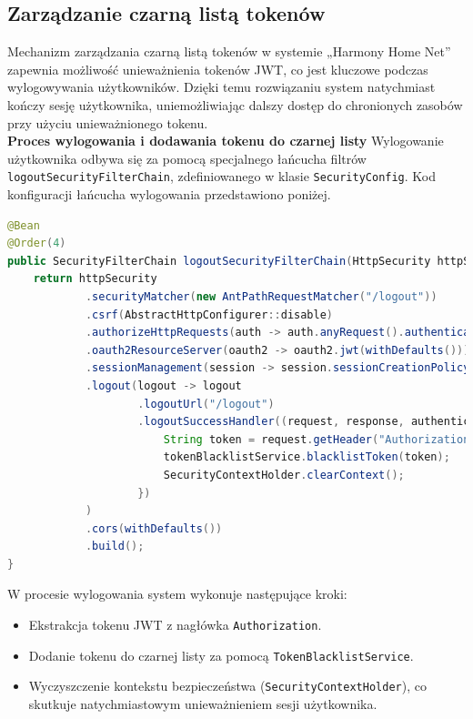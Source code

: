 \subsection{Zarządzanie czarną listą tokenów}

Mechanizm zarządzania czarną listą tokenów w systemie „Harmony Home Net” zapewnia możliwość unieważnienia tokenów JWT, co jest kluczowe podczas wylogowywania użytkowników. Dzięki temu rozwiązaniu system natychmiast kończy sesję użytkownika, uniemożliwiając dalszy dostęp do chronionych zasobów przy użyciu unieważnionego tokenu.\\[-10pt]

\noindent \textbf{Proces wylogowania i dodawania tokenu do czarnej listy}\newline
Wylogowanie użytkownika odbywa się za pomocą specjalnego łańcucha filtrów \texttt{logoutSecurityFilterChain}, zdefiniowanego w klasie \texttt{SecurityConfig}. Kod konfiguracji łańcucha wylogowania przedstawiono poniżej.

\begin{lstlisting}[language=Java, style=JavaStyle, caption=Konfiguracja łańcucha wylogowania]
@Bean
@Order(4)
public SecurityFilterChain logoutSecurityFilterChain(HttpSecurity httpSecurity) throws Exception {
    return httpSecurity
            .securityMatcher(new AntPathRequestMatcher("/logout"))
            .csrf(AbstractHttpConfigurer::disable)
            .authorizeHttpRequests(auth -> auth.anyRequest().authenticated())
            .oauth2ResourceServer(oauth2 -> oauth2.jwt(withDefaults()))
            .sessionManagement(session -> session.sessionCreationPolicy(SessionCreationPolicy.STATELESS))
            .logout(logout -> logout
                    .logoutUrl("/logout")
                    .logoutSuccessHandler((request, response, authentication) -> {
                        String token = request.getHeader("Authorization").replace("Bearer ", "");
                        tokenBlacklistService.blacklistToken(token);
                        SecurityContextHolder.clearContext();
                    })
            )
            .cors(withDefaults())
            .build();
}
\end{lstlisting}

\noindent W procesie wylogowania system wykonuje następujące kroki:
\begin{itemize}
    \item Ekstrakcja tokenu JWT z nagłówka \texttt{Authorization}.
    \item Dodanie tokenu do czarnej listy za pomocą \texttt{TokenBlacklistService}.
    \item Wyczyszczenie kontekstu bezpieczeństwa (\texttt{SecurityContextHolder}), co skutkuje natychmiastowym unieważnieniem sesji użytkownika.
\end{itemize}

